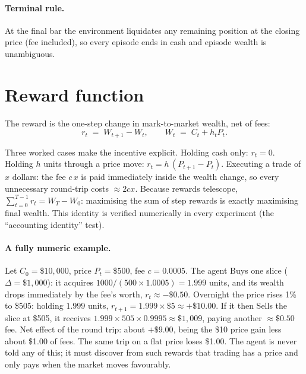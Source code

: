 \paragraph{Terminal rule.} At the final bar the environment liquidates any
remaining position at the closing price (fee included), so every episode
ends in cash and episode wealth is unambiguous.

\section{Reward function}
\label{sec:reward}

The reward is the one-step change in mark-to-market wealth, net of fees:
\begin{equation}
r_t \;=\; W_{t+1} - W_t, \qquad W_t \;=\; C_t + h_t P_t .
\label{eq:reward}
\end{equation}

Three worked cases make the incentive explicit. Holding cash only:
$r_t = 0$. Holding $h$ units through a price move:
$r_t = h\,(P_{t+1}-P_t)$. Executing a trade of $x$ dollars: the fee
$c\,x$ is paid immediately inside the wealth change, so every unnecessary
round-trip costs $\approx 2cx$. Because rewards telescope,
$\sum_{t=0}^{T-1} r_t = W_T - W_0$: maximising the sum of step rewards is
exactly maximising final wealth. This identity is verified numerically in
every experiment (the ``accounting identity'' test).

\paragraph{A fully numeric example.} Let $C_0 = \$10{,}000$, price
$P_t = \$500$, fee $c = 0.0005$. The agent Buys one slice
($\Delta = \$1{,}000$): it acquires $1000 / (500 \times 1.0005) = 1.999$
units, and its wealth drops immediately by the fee's worth,
$r_t \approx -\$0.50$. Overnight the price rises 1\% to \$505: holding
$1.999$ units, $r_{t+1} = 1.999 \times \$5 \approx +\$10.00$. If it then
Sells the slice at \$505, it receives
$1.999 \times 505 \times 0.9995 \approx \$1{,}009$, paying another
$\approx\$0.50$ fee. Net effect of the round trip: about $+\$9.00$, being
the \$10 price gain less about \$1.00 of fees. The same trip on a flat
price loses \$1.00. The agent is never told any of this; it must discover
from such rewards that trading has a price and only pays when the market
moves favourably.

